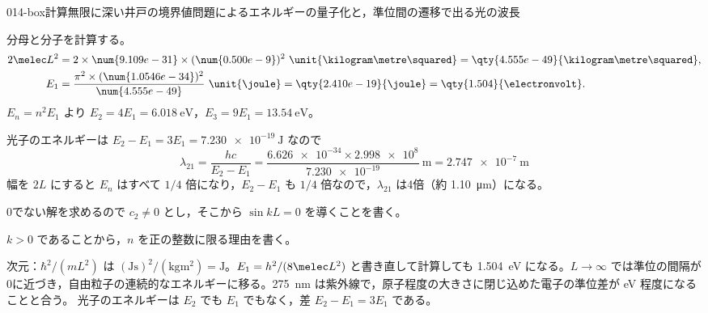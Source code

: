 \documentclass[uplatex,dvipdfmx,a4paper,11pt]{jsarticle}
\begin{document}
\begin{mondai}{014-box}{計算}{無限に深い井戸の境界値問題によるエネルギーの量子化と，準位間の遷移で出る光の波長}
\begin{tadashii}
 分母と分子を計算する。
\begin{align*}
  2\melec L^{2}&=2\times\num{9.109e-31}\times(\num{0.500e-9})^{2}\ \unit{\kilogram\metre\squared}=\qty{4.555e-49}{\kilogram\metre\squared},\\
  E_{1}&=\frac{\pi^{2}\times(\num{1.0546e-34})^{2}}{\num{4.555e-49}}\ \unit{\joule}=\qty{2.410e-19}{\joule}=\qty{1.504}{\electronvolt}.
\end{align*}
$E_{n}=n^{2}E_{1}$ より $E_{2}=4E_{1}=\qty{6.018}{\electronvolt}$，$E_{3}=9E_{1}=\qty{13.54}{\electronvolt}$。

 光子のエネルギーは $E_{2}-E_{1}=3E_{1}=\qty{7.230e-19}{\joule}$ なので
\[ \lambda_{21}=\frac{hc}{E_{2}-E_{1}}=\frac{\num{6.626e-34}\times\num{2.998e8}}{\num{7.230e-19}}\ \unit{\metre}=\qty{2.747e-7}{\metre} \]
幅を $2L$ にすると $E_{n}$ はすべて $1/4$ 倍になり，$E_{2}-E_{1}$ も $1/4$ 倍なので，$\lambda_{21}$ は4倍（約 \qty{1.10}{\micro\metre}）になる。
\begin{ronten}
  \item {} 0でない解を求めるので $c_{2}\ne 0$ とし，そこから $\sin kL=0$ を導くことを書く。
  \item {} $k>0$ であることから，$n$ を正の整数に限る理由を書く。
\end{ronten}
\kenzan 次元：$\hbar^{2}/(mL^{2})$ は $(\unit{\joule\second})^{2}/(\unit{\kilogram\metre\squared})=\unit{\joule}$。$E_{1}=h^{2}/(8\melec L^{2})$ と書き直して計算しても \qty{1.504}{\electronvolt} になる。$L\to\infty$ では準位の間隔が0に近づき，自由粒子の連続的なエネルギーに移る。\qty{275}{\nano\metre} は紫外線で，原子程度の大きさに閉じ込めた電子の準位差が \unit{\electronvolt} 程度になることと合う。
\tsumazuki 光子のエネルギーは $E_{2}$ でも $E_{1}$ でもなく，差 $E_{2}-E_{1}=3E_{1}$ である。
\end{tadashii}
\end{mondai}
\end{document}
